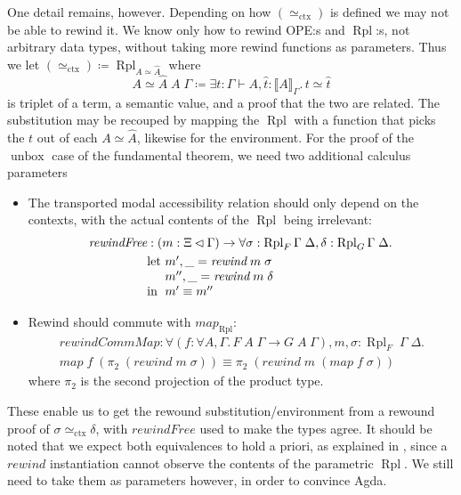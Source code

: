 \documentclass{article}
\theoremstyle{definition}\newtheorem{definition}{Definition}
\begin{document}
One detail remains, however.
Depending on how $(\simeq_\text{ctx})$ is defined we may not be able to rewind it.
We know only how to rewind OPE:s and $\operatorname{Rpl}$:s,
not arbitrary data types, without taking more rewind functions as parameters.
Thus we let $(\simeq_\text{ctx}) \coloneqq \operatorname{Rpl}_{A\simeq\widehat A}$ where
$$ A\!\simeq\!\widehat A \; A \; \Gamma \coloneqq \exists t : \Gamma \vdash A, \hat t : \llbracket A \rrbracket_\Gamma.\, t \simeq \hat t $$
is triplet of a term, a semantic value, and a proof that the two are related.
The substitution may be recouped by mapping the $\operatorname{Rpl}$
with a function that picks the $t$ out of each $A\!\simeq\!\widehat A$,
likewise for the environment.
For the proof of the $\operatorname{unbox}$ case of the fundamental theorem,
we need two additional calculus parameters
\begin{itemize}
\item The transported modal accessibility relation
  should only depend on the contexts,
  with the actual contents of the $\operatorname{Rpl}$ being irrelevant:
  \begin{align*}
    \textit{rewindFree} &: (m : \Xi\lhd\Gamma) \to \forall \sigma : \operatorname{Rpl}_F \Gamma \; \Delta, \delta : \operatorname{Rpl}_G \Gamma \; \Delta.\, \\
    &\begin{array}[t]{@{}l@{}l@{}}
      \text{let } & m' , \_ = \textit{rewind} \; m \; \sigma \\
      & m'' , \_ = \textit{rewind} \; m \; \delta \\
      \text{in } & m' \equiv m''
    \end{array}
  \end{align*}
\item Rewind should commute with $\textit{map}_{\operatorname{Rpl}}$:
  \begin{multline*}
  \textit{rewindCommMap} : \forall (f : \forall A, \Gamma.\, F \; A \; \Gamma \to G \; A \; \Gamma), m, \sigma : \operatorname{Rpl}_F \; \Gamma \; \Delta. \\
  \textit{map} \; f \; (\pi_2 \; (\textit{rewind} \; m \; \sigma)) \equiv \pi_2 \; (\textit{rewind} \; m \; (\textit{map} \; f \; \sigma))
  \end{multline*}
  where $\pi_2$ is the second projection of the product type.
\end{itemize}
These enable us to get the rewound substitution/environment
from a rewound proof of $\sigma \simeq_\text{ctx} \delta$,
with $\textit{rewindFree}$ used to make the types agree.
It should be noted that we expect both equivalences to hold a priori,
as explained in  \cite{wadler89},
since a $\textit{rewind}$ instantiation cannot observe
the contents of the parametric $\operatorname{Rpl}$.
We still need to take them as parameters however,
in order to convince Agda.
\end{document}
